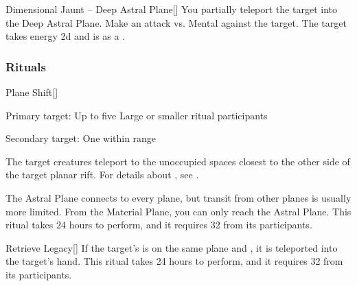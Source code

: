 \lowercase{\hypertarget{spell:Dimensional Jaunt -- Deep Astral Plane}{}}\label{spell:Dimensional Jaunt -- Deep Astral Plane}
\begin{freeability}[Rank 8]{\hypertarget{spell:Dimensional Jaunt -- Deep Astral Plane}{Dimensional Jaunt -- Deep Astral Plane}}[]
You partially teleport the target into the Deep Astral Plane.
Make an attack vs. Mental against the target.
\hit The target takes energy  \minus2d and is  as a .

\end{freeability}
\vspace{0.25em}



\subsubsection{Rituals}


\lowercase{\hypertarget{spell:Plane Shift}{}}\label{spell:Plane Shift}
\begin{freeability}[Rank 4]{\hypertarget{spell:Plane Shift}{Plane Shift}}[]

Primary target: Up to five Large or smaller ritual participants
\par\noindent
Secondary target: One  within \rngmed range

The target creatures teleport to the unoccupied spaces closest to the other side of the target planar rift.
For details about , see .

The Astral Plane connects to every plane, but transit from other planes is usually more limited.
From the Material Plane, you can only reach the Astral Plane.
This ritual takes 24 hours to perform, and it requires 32  from its participants.
\end{freeability}
\vspace{0.25em}



\lowercase{\hypertarget{spell:Retrieve Legacy}{}}\label{spell:Retrieve Legacy}
\begin{freeability}[Rank 4]{\hypertarget{spell:Retrieve Legacy}{Retrieve Legacy}}[]
If the target's  is on the same plane and , it is teleported into the target's hand.
This ritual takes 24 hours to perform, and it requires 32  from its participants.
\end{freeability}
\vspace{0.25em}



